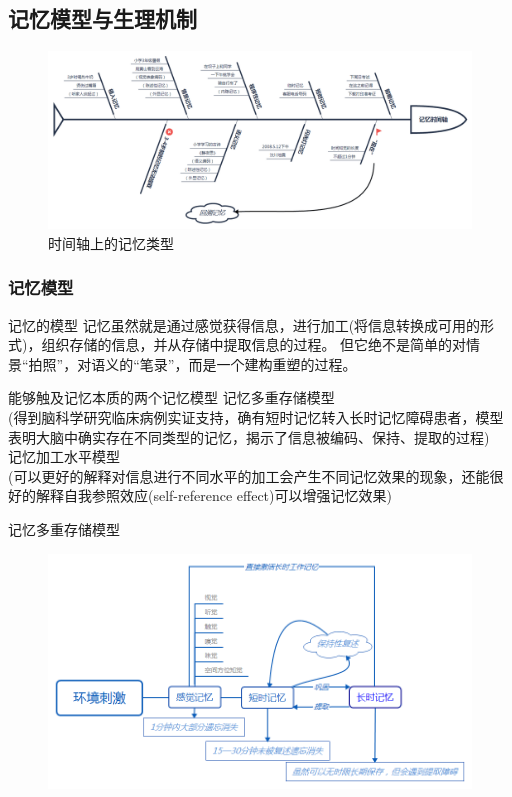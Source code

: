 \documentclass[serif]{beamer}
\begin{document}
  \subsection{记忆模型与生理机制}
  \begin{frame}
  	  \begin{figure}
  	  	\includegraphics[scale=0.25]{timeaxis.png}
  	  	\caption{时间轴上的记忆类型}
  	  \end{figure}
  \end{frame}
  
  \subsubsection{记忆模型}
  \begin{frame}{记忆的模型}
        记忆虽然就是通过感觉获得信息，进行加工(将信息转换成可用的形式)，组织存储的信息，并从存储中提取信息的过程。
        但它绝不是简单的对情景“拍照”，对语义的“笔录”，而是一个建构重塑的过程。
        \pause
        \begin{block}{能够触及记忆本质的两个记忆模型}
        	记忆多重存储模型\\
        	{\tiny (得到脑科学研究临床病例实证支持，确有短时记忆转入长时记忆障碍患者，模型表明大脑中确实存在不同类型的记忆，揭示了信息被编码、保持、提取的过程)}\\
            记忆加工水平模型\\
            {\tiny (可以更好的解释对信息进行不同水平的加工会产生不同记忆效果的现象，还能很好的解释自我参照效应(self-reference effect)可以增强记忆效果)}
        \end{block}
  \end{frame}
  
  \begin{frame}{记忆多重存储模型}
       \begin{figure}
       	\centering
       	\includegraphics[scale=0.4]{记忆多重存储模型.png}
       \end{figure}
  \end{frame}
  
\end{document}
